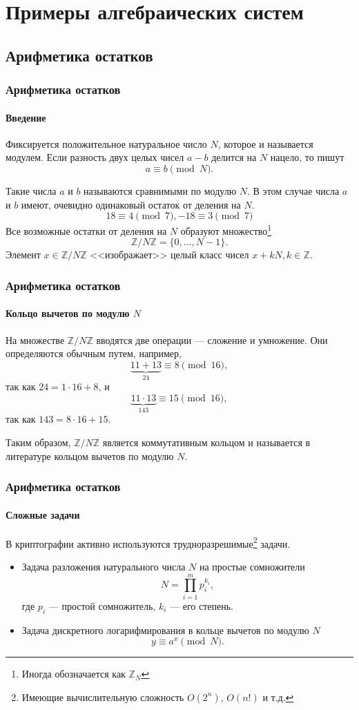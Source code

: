 \section{Примеры алгебраических систем}


\subsection{Арифметика остатков}

\begin{frame}
    \frametitle{Арифметика остатков}
    \framesubtitle{Введение}
    
    Фиксируется положительное натуральное число $N$, которое и называется \alert{модулем}. Если разность двух целых чисел $a-b$ делится на $N$ нацело, то пишут \[a\equiv b \pmod{N}.\]
    
    Такие числа $a$ и $b$ называются \alert{сравнимыми} по модулю \alert{$N$}. В этом случае числа $a$ и $b$ имеют, очевидно одинаковый остаток от деления на $N$.
    \[18\equiv 4\pmod{7}, -18\equiv 3\pmod{7}\]
    Все возможные остатки от деления на $N$ образуют множество\footnote{Иногда обозначается как $\mathbb{Z}_N$} \[\mathbb{Z}/N\mathbb{Z}=\{0,\ldots,N-1\}.\]
    Элемент $x\in\mathbb{Z}/N\mathbb{Z}$ <<изображает>> целый класс чисел $x+kN,k\in \mathbb{Z}$.
\end{frame}


\begin{frame}
    \frametitle{Арифметика остатков}
    \framesubtitle{Кольцо вычетов по модулю $N$}
    
    На множестве $\mathbb{Z}/N\mathbb{Z}$ вводятся две операции --- \alert{сложение} и \alert{умножение}. Они определяются обычным путем, например,
    \[\underbrace{11+13}_{24}\equiv 8 \pmod{16},\] так как $24=1\cdot 16 + 8$, и 
    \[\underbrace{11\cdot 13}_{143}\equiv 15 \pmod{16},\] так как $143=8\cdot 16 + 15$.
    
    Таким образом, $\mathbb{Z}/N\mathbb{Z}$ является \alert{коммутативным кольцом} и называется в литературе \alert{кольцом вычетов по модулю $N$}.
\end{frame}


\begin{frame}
    \frametitle{Арифметика остатков}
    \framesubtitle{Сложные задачи}
    
    В криптографии активно используются \alert{трудноразрешимые}\footnote{Имеющие вычислительную сложность $O(2^n)$, $O(n!)$ и т.д.} задачи.
    \begin{itemize}
        \item Задача разложения натурального числа $N$ на простые сомножители
            \[N=\prod_{i=1}^{m}p_i^{k_i},\]
            где $p_i$ --- простой сомножитель, $k_i$ --- его степень.
        \item Задача дискретного логарифмирования в кольце вычетов по модулю $N$
            \[y\equiv a^x\pmod{N}.\]
    \end{itemize}
\end{frame}


